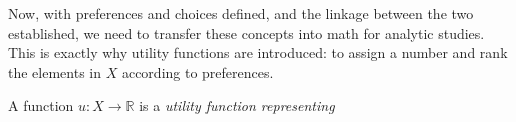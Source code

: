 Now, with preferences and choices defined, and the linkage between the two established, we need to transfer these concepts into math for analytic studies.
This is exactly why utility functions are introduced: to assign a number and rank the elements in $X$ according to preferences.

\begin{definition}
    A function $u:X\rightarrow\mathbb{R}$ is a \textit{utility function representing}
\end{definition}
